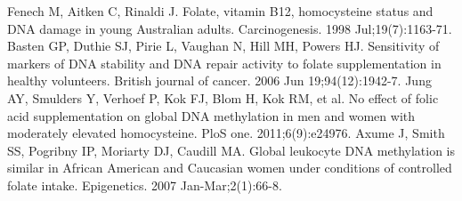 \begin{thebibliography}{12}
		Fenech M, Aitken C, Rinaldi J. Folate, vitamin B12, homocysteine status and DNA damage in young Australian adults. Carcinogenesis. 1998 Jul;19(7):1163-71.
		Basten GP, Duthie SJ, Pirie L, Vaughan N, Hill MH, Powers HJ. Sensitivity of markers of DNA stability and DNA repair activity to folate supplementation in healthy volunteers. British journal of cancer. 2006 Jun 19;94(12):1942-7.
		Jung AY, Smulders Y, Verhoef P, Kok FJ, Blom H, Kok RM, et al. No effect of folic acid supplementation on global DNA methylation in men and women with moderately elevated homocysteine. PloS one. 2011;6(9):e24976.
		Axume J, Smith SS, Pogribny IP, Moriarty DJ, Caudill MA. Global leukocyte DNA methylation is similar in African American and Caucasian women under conditions of controlled folate intake. Epigenetics. 2007 Jan-Mar;2(1):66-8.
\end{thebibliography}
